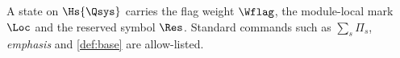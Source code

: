 \begin{definition}\label{def:base}
  A state on $\Hs{\Qsys}$ carries the flag weight $\Wflag$, the module-local
  mark $\Loc$ and the reserved symbol $\Res$. Standard commands such as
  $\sum_{s} \Pi_s$, \emph{emphasis} and \ref{def:base} are allow-listed.
\end{definition}
